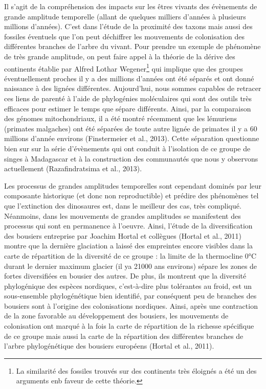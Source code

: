 Il s'agit de la compréhension des impacts sur les êtres vivants des
évènements de grande amplitude temporelle (allant de quelques milliers
d'années à plusieurs millions d'années). C'est dans l'étude de la
proximité des taxons mais aussi des fossiles éventuels que l'on peut
déchiffrer les mouvements de colonisation des différentes branches de
l'arbre du vivant. Pour prendre un exemple de phénomène de très grande
amplitude, on peut faire appel à la théorie de la dérive des continents
établie par Alfred Lothar Wegener\footnote{La similarité des fossiles
  trouvés sur des continents très éloignés a été un des arguments enb
  faveur de cette théorie.} qui implique que des groupes éventuellement
proches il y a des millions d'années ont été séparés et ont donné
naissance à des lignées différentes. Aujourd'hui, nous sommes capables
de retracer ces liens de parenté à l'aide de phylogénies moléculaires
qui sont des outils très efficaces pour estimer le temps que sépare
différents. Ainsi, par la comparaison des génomes mitochondriaux, il a
été montré récemment que les lémuriens (primates malgaches) ont été
séparées de toute autre lignée de primates il y a 60 millions d'année
environs (Finstermeier et al., 2013). Cette séparation questionne bien
sur sur la série d'évènements qui ont conduit à l'isolation de ce groupe
de singes à Madagascar et à la construction des communautés que nous y
observons actuellement (Razafindratsima et al., 2013).

Les processus de grandes amplitudes temporelles sont cependant dominés
par leur composante historique (et donc non reproductible) et prédire
des phénomènes tel que l'extinction des dinosaures est, dans le meilleur
des cas, très compliqué. Néanmoins, dans les mouvements de grandes
amplitudes se manifestent des processus qui sont en permanence à
l'oeuvre. Ainsi, l'étude de la diversification des bousiers entreprise
par Joachim Hortal et collègues (Hortal et al., 2011) montre que la
dernière glaciation a laissé des empreintes encore visibles dans la
carte de répartition de la diversité de ce groupe : la limite de la
thermocline 0°C durant le dernier maximum glacier (il ya 21000 ans
environs) sépare les zones de fortes diversifiées en bousier des autres.
De plus, ils montrent que la diversité phylogénique des espèces
nordiques, c'est-à-dire plus tolérantes au froid, est un sous-ensemble
phylogénétique bien identifié, par conséquent peu de branches des
bousiers sont à l'origine des colonisations nordiques. Ainsi, après une
contraction de la zone favorable au développement des bousiers, les
mouvements de colonisation ont marqué à la fois la carte de répartition
de la richesse spécifique de ce groupe mais aussi la carte de la
répartition des différentes branches de l'arbre phylogénétique des
bousiers européens (Hortal et al., 2011).

